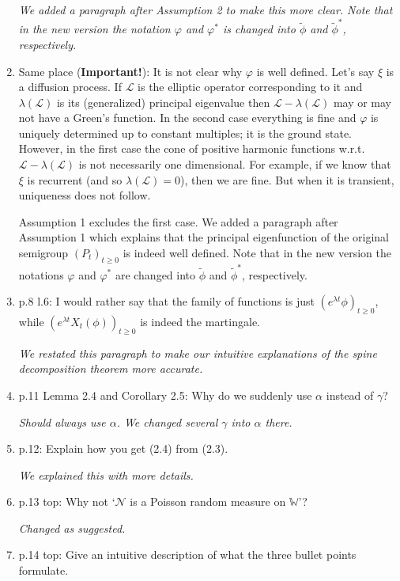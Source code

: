 \documentclass[12pt,a4paper]{amsart}
\numberwithin{equation}{section}
\theoremstyle{plain}
\theoremstyle{definition}
\begin{document}
\begin{enumerate}
  {\it We added a paragraph after Assumption 2 to make this more clear.
    Note that in the new version the notation $\varphi$ and $\varphi^*$ is changed into $\widetilde \phi$ and $\widetilde \phi^*$, respectively.}
\item
  Same place ({\bf Important!}): It is not clear why $\varphi$ is well defined.
  Let's say $\xi$ is a diffusion process.
  If $\mathcal L$ is the elliptic operator corresponding to it and $\lambda(\mathcal L)$ is its (generalized) principal eigenvalue then $\mathcal L - \lambda(\mathcal L)$ may or may not have a Green's function.
  In the second case everything is fine and $\varphi$ is uniquely determined up to constant multiples; it is the ground state.
  However, in the first case the cone of positive harmonic functions w.r.t. $\mathcal L - \lambda(\mathcal L)$ is not necessarily one dimensional.
  For example, if we know that $\xi$ is recurrent (and so $\lambda(\mathcal L) = 0$), then we are fine.
  But when it is transient, uniqueness does not follow.

  {\it 
 
  Assumption 1 excludes the first case. We added a paragraph after Assumption 1
  which explains that the principal eigenfunction of the original semigroup $(P_t)_{t\ge0}$ is indeed well defined.
    Note that in the new version the notations $\varphi$ and $\varphi^*$ are changed into $\widetilde \phi$ and $\widetilde \phi^*$, respectively.}
\item
  p.8 l.6: I would rather say that the family of functions is just $(e^{\lambda t} \phi)_{t\geq 0}$, while $(e^{\lambda t} X_t(\phi))_{t\geq 0}$ is indeed the martingale.

  {\it We restated this paragraph to make our intuitive explanations of the spine decomposition theorem more accurate. }
\item
  p.11 Lemma 2.4 and Corollary 2.5:
  Why do we suddenly use $\alpha$ instead of $\gamma$?

  {\it Should always use $\alpha$.
     We changed several $\gamma$ into $\alpha$ there.}
\item
  p.12: Explain how you get (2.4) from (2.3).

  {\it We explained this with more details.}
\item
  p.13 top: Why not `$\mathcal N$ is a Poisson random measure on $\mathbb W$'?

  {\it Changed as suggested.}
\item
  p.14 top: Give an intuitive description of what the three bullet points formulate.


\end{enumerate}
\end{document}
